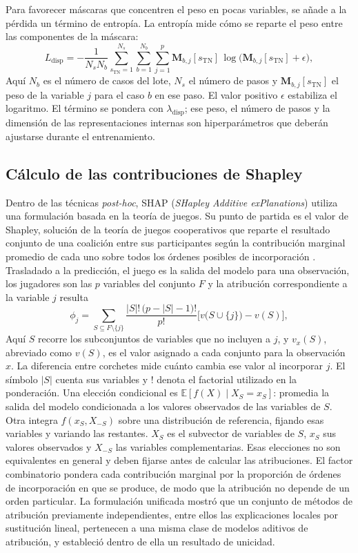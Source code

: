 Para favorecer máscaras que concentren el peso en pocas variables, se añade a la pérdida un término de entropía. La entropía mide cómo se reparte el peso entre las componentes de la máscara:
\[
L_{\text{disp}}=-\frac{1}{N_{s}N_{b}}\sum_{s_{\mathrm{TN}}=1}^{N_{s}}\sum_{b=1}^{N_{b}}\sum_{j=1}^{p}
\mathbf{M}_{b,j}[s_{\mathrm{TN}}]\,\log\big(\mathbf{M}_{b,j}[s_{\mathrm{TN}}]+\epsilon\big),
\]
Aquí $N_b$ es el número de casos del lote, $N_s$ el número de pasos y $\mathbf M_{b,j}[s_{\mathrm{TN}}]$ el peso de la variable $j$ para el caso $b$ en ese paso. El valor positivo $\epsilon$ estabiliza el logaritmo. El término se pondera con $\lambda_{\text{disp}}$; ese peso, el número de pasos y la dimensión de las representaciones internas son hiperparámetros que deberán ajustarse durante el entrenamiento.


\subsection{Cálculo de las contribuciones de Shapley}\label{clara:shapcalculo}
Dentro de las técnicas \textit{post-hoc}, SHAP (\textit{SHapley Additive exPlanations}) utiliza una formulación basada en la teoría de juegos. Su punto de partida es el valor de Shapley, solución de la teoría de juegos cooperativos que reparte el resultado conjunto de una coalición entre sus participantes según la contribución marginal promedio de cada uno sobre todos los órdenes posibles de incorporación \cite{shapley1953}. Trasladado a la predicción, el juego es la salida del modelo para una observación, los jugadores son las $p$ variables del conjunto $F$ y la atribución correspondiente a la variable $j$ resulta
\begin{equation}\label{eq:shapley}
\phi_{j}=\sum_{S\subseteq F\setminus\{j\}}
\frac{|S|!\,\big(p-|S|-1\big)!}{p!}
\Big[v\big(S\cup\{j\}\big)-v(S)\Big],
\end{equation}
Aquí $S$ recorre los subconjuntos de variables que no incluyen a $j$, y $v_x(S)$, abreviado como $v(S)$, es el valor asignado a cada conjunto para la observación $x$. La diferencia entre corchetes mide cuánto cambia ese valor al incorporar $j$. El símbolo $|S|$ cuenta sus variables y $!$ denota el factorial utilizado en la ponderación. Una elección condicional es $\mathbb{E}[f(X)\mid X_S=x_S]$: promedia la salida del modelo condicionada a los valores observados de las variables de $S$. Otra integra $f(x_S,X_{-S})$ sobre una distribución de referencia, fijando esas variables y variando las restantes. $X_S$ es el subvector de variables de $S$, $x_S$ sus valores observados y $X_{-S}$ las variables complementarias. Esas elecciones no son equivalentes en general y deben fijarse antes de calcular las atribuciones. El factor combinatorio pondera cada contribución marginal por la proporción de órdenes de incorporación en que se produce, de modo que la atribución no depende de un orden particular. La formulación unificada mostró que un conjunto de métodos de atribución previamente independientes, entre ellos las explicaciones locales por sustitución lineal, pertenecen a una misma clase de modelos aditivos de atribución, y estableció dentro de ella un resultado de unicidad.


